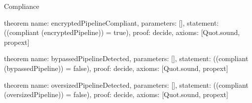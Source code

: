 \begin{lexlean}{Compliance}
\begin{semanticmodule}
theorem{
  name: encryptedPipelineCompliant,
  parameters: [],
  statement: ((compliant (encryptedPipeline)) = true),
  proof: decide{},
  axioms: [Quot.sound, propext]
}

theorem{
  name: bypassedPipelineDetected,
  parameters: [],
  statement: ((compliant (bypassedPipeline)) = false),
  proof: decide{},
  axioms: [Quot.sound, propext]
}

theorem{
  name: oversizedPipelineDetected,
  parameters: [],
  statement: ((compliant (oversizedPipeline)) = false),
  proof: decide{},
  axioms: [Quot.sound, propext]
}
\end{semanticmodule}
\end{lexlean}
